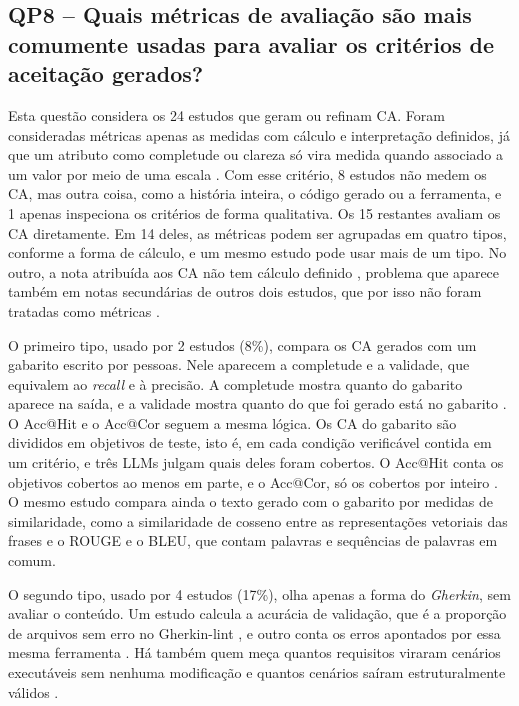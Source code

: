\subsection{QP8 -- Quais métricas de avaliação são mais comumente usadas para avaliar os critérios de aceitação gerados?}
\label{sec:qp8}

Esta questão considera os 24 estudos que geram ou refinam CA. Foram consideradas métricas apenas as medidas com cálculo e interpretação definidos, já que um atributo como completude ou clareza só vira medida quando associado a um valor por meio de uma escala \cite{wohlin2000}. Com esse critério, 8 estudos não medem os CA, mas outra coisa, como a história inteira, o código gerado ou a ferramenta, e 1 apenas inspeciona os critérios de forma qualitativa. Os 15 restantes avaliam os CA diretamente. Em 14 deles, as métricas podem ser agrupadas em quatro tipos, conforme a forma de cálculo, e um mesmo estudo pode usar mais de um tipo. No outro, a nota atribuída aos CA não tem cálculo definido \cite{rotar2025}, problema que aparece também em notas secundárias de outros dois estudos, que por isso não foram tratadas como métricas \cite{ferreira2025,matveeva2025}.

O primeiro tipo, usado por 2 estudos (8\%), compara os CA gerados com um gabarito escrito por pessoas. Nele aparecem a completude e a validade, que equivalem ao \textit{recall} e à precisão. A completude mostra quanto do gabarito aparece na saída, e a validade mostra quanto do que foi gerado está no gabarito \cite{li2024}. O Acc@Hit e o Acc@Cor seguem a mesma lógica. Os CA do gabarito são divididos em objetivos de teste, isto é, em cada condição verificável contida em um critério, e três LLMs julgam quais deles foram cobertos. O Acc@Hit conta os objetivos cobertos ao menos em parte, e o Acc@Cor, só os cobertos por inteiro \cite{wang2025}. O mesmo estudo compara ainda o texto gerado com o gabarito por medidas de similaridade, como a similaridade de cosseno entre as representações vetoriais das frases e o ROUGE e o BLEU, que contam palavras e sequências de palavras em comum.

O segundo tipo, usado por 4 estudos (17\%), olha apenas a forma do \textit{Gherkin}, sem avaliar o conteúdo. Um estudo calcula a acurácia de validação, que é a proporção de arquivos sem erro no Gherkin-lint \cite{karpurapu2024}, e outro conta os erros apontados por essa mesma ferramenta \cite{matveeva2025}. Há também quem meça quantos requisitos viraram cenários executáveis sem nenhuma modificação \cite{zyberaj2026} e quantos cenários saíram estruturalmente válidos \cite{huang2026}.

